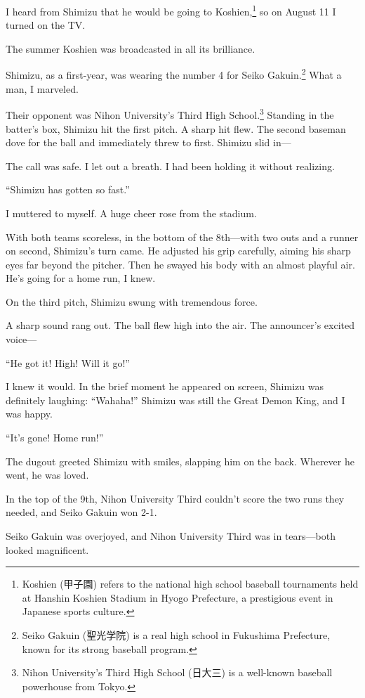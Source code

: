 \documentclass[
    a4paper,
    12pt,
    twoside,
    openany,
    UTF8,
    fontset=windows
]{ctexbook}
\begin{document}
I heard from Shimizu that he would be going to Koshien,\footnote{Koshien (甲子園) refers to the national high school baseball tournaments held at Hanshin Koshien Stadium in Hyogo Prefecture, a prestigious event in Japanese sports culture.} so on August 11 I turned on the TV.

The summer Koshien was broadcasted in all its brilliance.

Shimizu, as a first-year, was wearing the number 4 for Seiko Gakuin.\footnote{Seiko Gakuin (聖光学院) is a real high school in Fukushima Prefecture, known for its strong baseball program.} What a man, I marveled.

Their opponent was Nihon University's Third High School.\footnote{Nihon University's Third High School (日大三) is a well-known baseball powerhouse from Tokyo.} Standing in the batter's box, Shimizu hit the first pitch. A sharp hit flew. The second baseman dove for the ball and immediately threw to first. Shimizu slid in---

The call was safe. I let out a breath. I had been holding it without realizing.

``Shimizu has gotten so fast.''

I muttered to myself. A huge cheer rose from the stadium.

With both teams scoreless, in the bottom of the 8th---with two outs and a runner on second, Shimizu's turn came. He adjusted his grip carefully, aiming his sharp eyes far beyond the pitcher. Then he swayed his body with an almost playful air. He's going for a home run, I knew.

On the third pitch, Shimizu swung with tremendous force.

A sharp sound rang out. The ball flew high into the air. The announcer's excited voice---

``He got it! High! Will it go!''

I knew it would. In the brief moment he appeared on screen, Shimizu was definitely laughing: ``Wahaha!'' Shimizu was still the Great Demon King, and I was happy.

``It's gone! Home run!''

The dugout greeted Shimizu with smiles, slapping him on the back. Wherever he went, he was loved.

In the top of the 9th, Nihon University Third couldn't score the two runs they needed, and Seiko Gakuin won 2-1.

Seiko Gakuin was overjoyed, and Nihon University Third was in tears---both looked magnificent.
\end{document}
